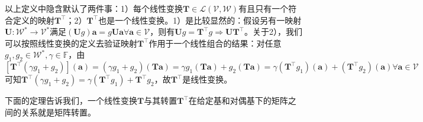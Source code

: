 \documentclass[main.tex]{subfiles}
\begin{document}
以上定义中隐含默认了两件事：1）每个线性变换$\mathbf{T}\in\mathcal{L}\left(\mathcal{V},\mathcal{W}\right)$有且只有一个符合定义的映射$\mathbf{T}^\intercal$；2）$\mathbf{T}^\intercal$也是一个线性变换。1）是比较显然的：假设另有一映射$\mathbf{U}:\mathcal{W}^*\rightarrow\mathcal{V}^*$满足$\left(\mathbf{U}g\right)\mathbf{a}=g\mathbf{Ua}\forall\mathbf{a}\in\mathcal{V}$，则有$\mathbf{U}g=\mathbf{T}^\intercal g\Rightarrow\mathbf{U}\mathbf{T}^\intercal$。关于2），我们可以按照线性变换的定义去验证映射$\mathbf{T}^\intercal$作用于一个线性组合的结果：对任意$g_1,g_2\in\mathcal{W}^*,\gamma\in\mathbb{F}$，由$\left[\mathbf{T}^\intercal\left(\gamma g_1+g_2\right)\right]\left(\mathbf{a}\right)=\left(\gamma g_1+g_2\right)\left(\mathbf{Ta}\right)=\gamma g_1\left(\mathbf{Ta}\right)+g_2\left(\mathbf{Ta}\right)=\gamma\left(\mathbf{T}^\intercal g_1\right)\left(\mathbf{a}\right)+\left(\mathbf{T}^\intercal g_2\right)\left(\mathbf{a}\right)\forall\mathbf{a}\in\mathcal{V}$可知$\mathbf{T}^\intercal\left(\gamma g_1+g_2\right)=\gamma\left(\mathbf{T}^\intercal g_1\right)+\mathbf{T}^\intercal g_2$，故$\mathbf{T}^\intercal$是线性变换。

下面的定理告诉我们，一个线性变换$\mathbf{T}$与其转置$\mathbf{T}^\intercal$在给定基和对偶基下的矩阵之间的关系就是矩阵转置。
\end{document}
